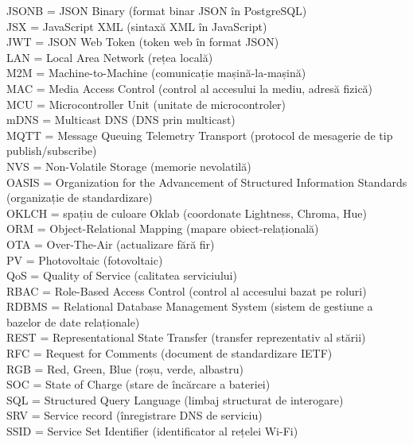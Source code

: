 \documentclass[12pt, a4paper, twoside, romanian]{teza-upb}
\begin{document}
{  JSONB = JSON Binary (format binar JSON în PostgreSQL)\\
  JSX = JavaScript XML (sintaxă XML în JavaScript)\\
  JWT = JSON Web Token (token web în format JSON)\\
  LAN = Local Area Network (rețea locală)\\
  M2M = Machine-to-Machine (comunicație mașină-la-mașină)\\
  MAC = Media Access Control (control al accesului la mediu, adresă fizică)\\
  MCU = Microcontroller Unit (unitate de microcontroler)\\
  mDNS = Multicast DNS (DNS prin multicast)\\
  MQTT = Message Queuing Telemetry Transport (protocol de mesagerie de tip publish/subscribe)\\
  NVS = Non-Volatile Storage (memorie nevolatilă)\\
  OASIS = Organization for the Advancement of Structured Information Standards (organizație de standardizare)\\
  OKLCH = spațiu de culoare Oklab (coordonate Lightness, Chroma, Hue)\\
  ORM = Object-Relational Mapping (mapare obiect-relațională)\\
  OTA = Over-The-Air (actualizare fără fir)\\
  PV = Photovoltaic (fotovoltaic)\\
  QoS = Quality of Service (calitatea serviciului)\\
  RBAC = Role-Based Access Control (control al accesului bazat pe roluri)\\
  RDBMS = Relational Database Management System (sistem de gestiune a bazelor de date relaționale)\\
  REST = Representational State Transfer (transfer reprezentativ al stării)\\
  RFC = Request for Comments (document de standardizare IETF)\\
  RGB = Red, Green, Blue (roșu, verde, albastru)\\
  SOC = State of Charge (stare de încărcare a bateriei)\\
  SQL = Structured Query Language (limbaj structurat de interogare)\\
  SRV = Service record (înregistrare DNS de serviciu)\\
  SSID = Service Set Identifier (identificator al rețelei Wi-Fi)\\
}
\end{document}

